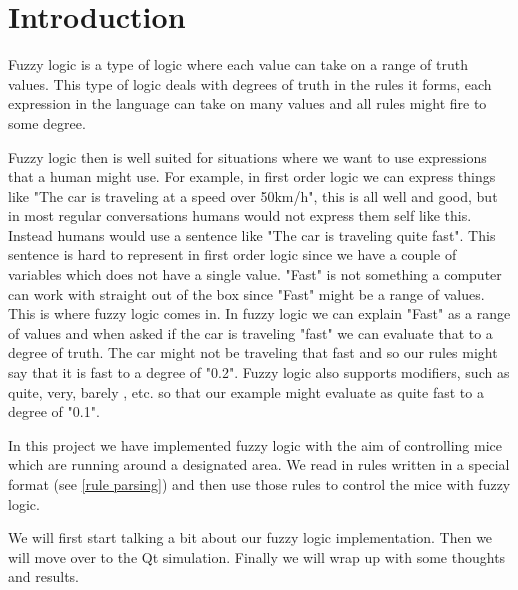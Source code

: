 \section{Introduction}\label{intro}
Fuzzy logic is a type of logic where each value can take on a range of truth values.
This type of logic deals with degrees of truth in the rules it forms, each expression
in the language can take on many values and all rules might fire to some degree.

Fuzzy logic then is well suited for situations where we want to use expressions that
a human might use. For example, in first order logic we can express things like "The
car is traveling at a speed over 50km/h", this is all well and good, but in most regular
conversations humans would not express them self like this. Instead humans would use
a sentence like "The car is traveling quite fast". This sentence is hard to represent
in first order logic since we have a couple of variables which does not have a single 
value. "Fast" is not something a computer can work with straight out of the box since 
"Fast" might be a range of values. This is where fuzzy logic comes in. In fuzzy logic
we can explain "Fast" as a range of values and when asked if the car is traveling "fast"
we can evaluate that to a degree of truth. The car might not be traveling that fast and
so our rules might say that it is fast to a degree of "0.2". Fuzzy logic also supports
modifiers, such as quite, very, barely , etc. so that our example might evaluate as
quite fast to a degree of "0.1".

In this project we have implemented fuzzy logic with the aim of controlling mice which
are running around a designated area. We read in rules written in a special format (see
\ref{rule parsing}) and then use those rules to control the mice with fuzzy logic.

We will first start talking a bit about our fuzzy logic implementation. Then we will move
over to the Qt simulation. Finally we will wrap up with some thoughts and results.
